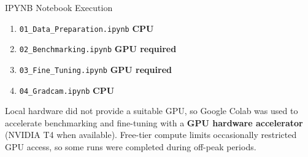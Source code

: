 \documentclass[aspectratio=169,11pt]{beamer}
\newcommand{\stepitem}{\item<+->}
\newcommand{\stepitem}{\item}
\begin{document}
\begin{frame}{IPYNB Notebook Execution}

\vspace{-0.25em}

\begin{enumerate}
\setlength{\itemsep}{0.62em}

\stepitem \texttt{01\_Data\_Preparation.ipynb}
\hfill {\small\color{projectblue}\textbf{CPU}}

\stepitem \texttt{02\_Benchmarking.ipynb}
\hfill {\small\color{projectblue}\textbf{GPU required}}

\stepitem \texttt{03\_Fine\_Tuning.ipynb}
\hfill {\small\color{projectblue}\textbf{GPU required}}

\stepitem \texttt{04\_Gradcam.ipynb}
\hfill {\small\color{projectblue}\textbf{CPU}}

\end{enumerate}

\vspace{0.45em}

\centering
{\small
Local hardware did not provide a suitable GPU, so Google Colab was used to
accelerate benchmarking and fine-tuning with a \textbf{GPU hardware accelerator}
(NVIDIA T4 when available). Free-tier compute limits occasionally restricted
GPU access, so some runs were completed during off-peak periods.
}

\end{frame}




\end{document}
